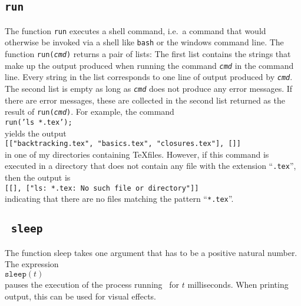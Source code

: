 \subsection{\texttt{run}}
The function \texttt{run} executes a shell command, i.e.~a command that would otherwise be
invoked via a shell like \texttt{bash} or the windows command line.  The function \texttt{run(\textsl{cmd})} returns a pair
of lists: The first list contains the strings that make up the output produced when running the
command  \texttt{\textsl{cmd}} in the command line.  Every string in the list corresponds to one line
of output produced by  \texttt{\textsl{cmd}}. 
 The second list is empty as long as   \texttt{\textsl{cmd}} does not produce any error messages.
 If there are error messages, these are collected in the second list returned as the result of   \texttt{run(\textsl{cmd})}.
For example, the command
\\[0.2cm]
\hspace*{1.3cm}
\texttt{run('ls *.tex');}
\\[0.2cm]
yields the output
\\[0.2cm]
\hspace*{1.3cm}
\texttt{[["backtracking.tex", "basics.tex", "closures.tex"], []]}
\\[0.2cm]
in one of my directories containing \TeX files.  However, if this command is executed in a
directory that does not contain any file with the extension ``\texttt{.tex}'', then the output is
\\[0.2cm]
\hspace*{1.3cm}
\texttt{[[], ["ls: *.tex: No such file or directory"]]}
\\[0.2cm]
indicating that there are no files matching the pattern ``\texttt{*.tex}''.

\subsection{\texttt{\ sleep}}
The function sleep takes one argument that has to be a positive natural number.  The expression
\\[0.2cm]
\hspace*{1.3cm}
$\texttt{sleep}(t)$
\\[0.2cm]
pauses the execution of the process running \setlx\ for $t$ milliseconds.  When printing
output, this can be used for visual effects.


